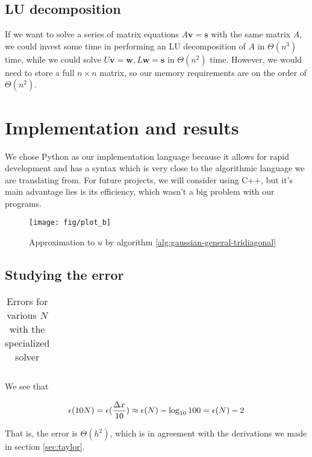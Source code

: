 \documentclass[a4paper]{article}
\begin{document}
\subsection{LU decomposition}
\label{sec:lu}
If we want to solve a series of matrix equations $A\mathbf{v} = \mathbf{s}$ with the same matrix $A$, we could invest some time in performing an LU decomposition of $A$ in $\Theta(n^3)$ time, while we could solve $U\mathbf{v} = \mathbf{w}, L\mathbf{w} = \mathbf{s}$ in $\Theta(n^2)$ time. However, we would need to store a full $n \times n$ matrix, so our memory requirements are on the order of $\Theta(n^2)$.

\section{Implementation and results}\label{sec:implementation_and_results}
We chose Python as our implementation language because it allows for rapid development and has a syntax which is very close to the algorithmic language we are translating from. For future projects, we will consider using C++, but it's main advantage lies is its efficiency, which wasn't a big problem with our programs.



\begin{figure}[ht]
\texttt{[image: fig/plot\_b]}
\caption{Approximation to $u$ by algorithm \ref{alg:gaussian-general-tridiagonal}}
\end{figure}

\subsection{Studying the error}

\begin{table}[htbp]
\begin{center}
\begin{tabular}{r r}
    
\end{tabular}
\caption{Errors for various $N$ with the specialized solver}
\end{center}
\end{table}

We see that

\begin{equation}
    \epsilon(10N) = \epsilon(\frac{{\Delta x}}{10}) \approx \epsilon(N) - \log_{10}{100} = \epsilon(N) - 2
\end{equation}

That is, the error is $\Theta(h^2)$, which is in agreement with the derivations we made in section \ref{sec:taylor}.
\end{document}
